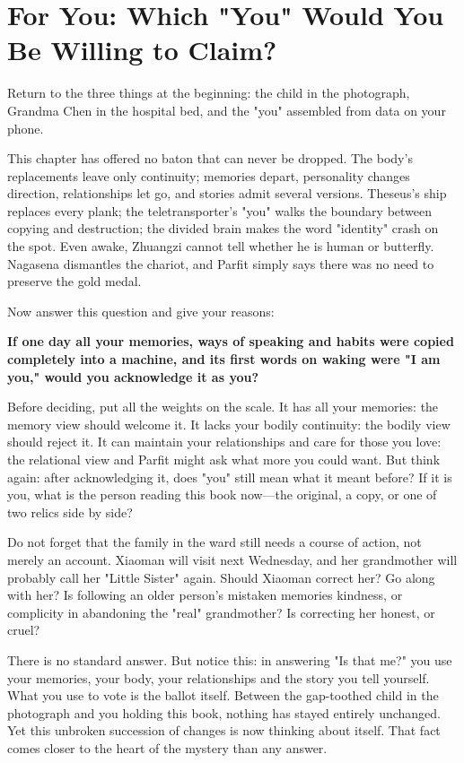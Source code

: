 \section[Which "You" Would You Claim?]{For You: Which "You" Would You Be Willing to Claim?}
Return to the three things at the beginning: the child in the photograph, Grandma Chen in the hospital bed, and the "you" assembled from data on your phone.

This chapter has offered no baton that can never be dropped. The body's replacements leave only continuity; memories depart, personality changes direction, relationships let go, and stories admit several versions. Theseus's ship replaces every plank; the teletransporter's "you" walks the boundary between copying and destruction; the divided brain makes the word "identity" crash on the spot. Even awake, Zhuangzi cannot tell whether he is human or butterfly. Nagasena dismantles the chariot, and Parfit simply says there was no need to preserve the gold medal.

Now answer this question and give your reasons:

\textbf{If one day all your memories, ways of speaking and habits were copied completely into a machine, and its first words on waking were "I am you," would you acknowledge it as you?}

Before deciding, put all the weights on the scale. It has all your memories: the memory view should welcome it. It lacks your bodily continuity: the bodily view should reject it. It can maintain your relationships and care for those you love: the relational view and Parfit might ask what more you could want. But think again: after acknowledging it, does "you" still mean what it meant before? If it is you, what is the person reading this book now---the original, a copy, or one of two relics side by side?

Do not forget that the family in the ward still needs a course of action, not merely an account. Xiaoman will visit next Wednesday, and her grandmother will probably call her "Little Sister" again. Should Xiaoman correct her? Go along with her? Is following an older person's mistaken memories kindness, or complicity in abandoning the "real" grandmother? Is correcting her honest, or cruel?

There is no standard answer. But notice this: in answering "Is that me?" you use your memories, your body, your relationships and the story you tell yourself. What you use to vote is the ballot itself. Between the gap-toothed child in the photograph and you holding this book, nothing has stayed entirely unchanged. Yet this unbroken succession of changes is now thinking about itself. That fact comes closer to the heart of the mystery than any answer.
